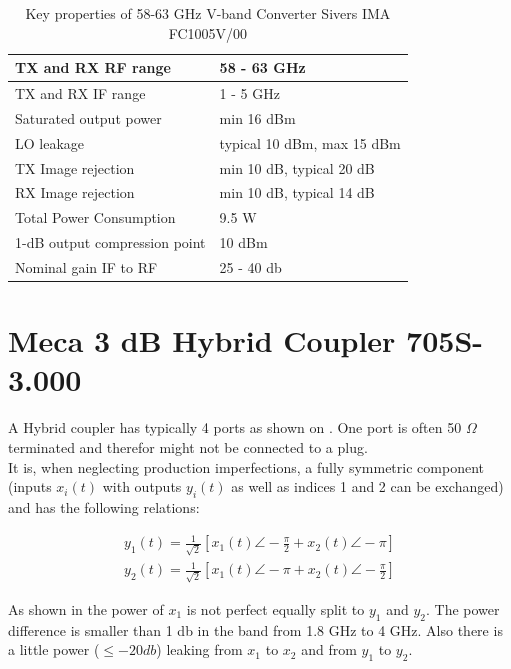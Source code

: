 \begin{table}[h]
  \centering
  \begin{tabular}{|l|l|}
    \hline
    \gls{TX} and \gls{RX} \gls{RF} range & 58 - 63 GHz \\ \hline
    \gls{TX} and \gls{RX} \gls{IF} range & 1 - 5 GHz \\ \hline
    Saturated output power & min 16 dBm \\ \hline
    \gls{LO} leakage & typical 10 dBm, max 15 dBm \\ \hline
    \gls{TX} Image rejection & min 10 dB, typical 20 dB \\ \hline
    \gls{RX} Image rejection & min 10 dB, typical 14 dB \\ \hline
    Total Power Consumption & 9.5 W \\ \hline
    1-dB output compression point & 10 dBm \\ \hline
    Nominal gain \gls{IF} to \gls{RF} & 25 - 40 db \\ \hline
  \end{tabular}
  \caption{Key properties of 58-63 GHz V-band Converter Sivers IMA FC1005V/00
    \cite{sivers_fc1005v}}
  \label{tab:awg}
\end{table}

\section{Meca 3 dB Hybrid Coupler 705S-3.000}
\label{sec:comp_90deg}

A Hybrid coupler has typically 4 ports as shown on
.
One port is often 50 $\Omega$ terminated and therefor might not be connected
to a plug. \\

It is, when neglecting production imperfections, a fully symmetric component
(inputs $x_i(t)$ with outputs $y_i(t)$ as well as indices 1 and 2
can be exchanged) and has the following relations:

\begin{align}
  y_1(t) = \frac{1}{\sqrt{2}} \left[x_1(t) \angle -\frac{\pi}{2} + x_2(t) \angle -\pi \right] \\
  y_2(t) = \frac{1}{\sqrt{2}} \left[x_1(t) \angle -\pi + x_2(t) \angle -\frac{\pi}{2} \right]
\end{align}

As shown in  the power of
$x_1$ is not perfect equally split to $y_1$ and $y_2$. The power difference
is smaller than 1 db in the band from 1.8 GHz to 4 GHz.
Also there is a little power ($\leq -20 db$) leaking from $x_1$ to $x_2$ and from
$y_1$ to $y_2$. \\

